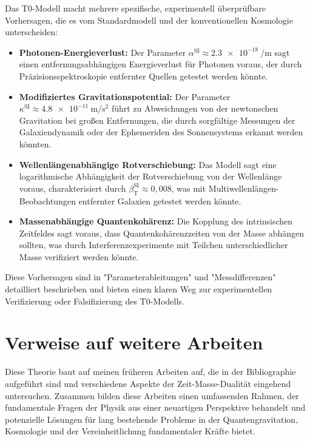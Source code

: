 \documentclass[a4paper,12pt]{article}
\newcommand{\betaT}{\beta_{\text{T}}}
\begin{document}
	Das T0-Modell macht mehrere spezifische, experimentell überprüfbare Vorhersagen, die es vom Standardmodell und der konventionellen Kosmologie unterscheiden:
	
	\begin{itemize}
		\item \textbf{Photonen-Energieverlust:} Der Parameter \(\alpha^{\text{SI}} \approx \SI{2,3e-18}{\per\meter}\) sagt einen entfernungsabhängigen Energieverlust für Photonen voraus, der durch Präzisionsspektroskopie entfernter Quellen getestet werden könnte.
		
		\item \textbf{Modifiziertes Gravitationspotential:} Der Parameter \(\kappa^{\text{SI}} \approx \SI{4,8e-11}{\meter\per\second\squared}\) führt zu Abweichungen von der newtonschen Gravitation bei großen Entfernungen, die durch sorgfältige Messungen der Galaxiendynamik oder der Ephemeriden des Sonnensystems erkannt werden könnten.
		
		\item \textbf{Wellenlängenabhängige Rotverschiebung:} Das Modell sagt eine logarithmische Abhängigkeit der Rotverschiebung von der Wellenlänge voraus, charakterisiert durch \(\betaT^{\text{SI}} \approx 0,008\), was mit Multiwellenlängen-Beobachtungen entfernter Galaxien getestet werden könnte.
		
		\item \textbf{Massenabhängige Quantenkohärenz:} Die Kopplung des intrinsischen Zeitfeldes sagt voraus, dass Quantenkohärenzzeiten von der Masse abhängen sollten, was durch Interferenzexperimente mit Teilchen unterschiedlicher Masse verifiziert werden könnte.
	\end{itemize}
	
	Diese Vorhersagen sind in "Parameterableitungen" \cite{pascher_params_2025} und "Messdifferenzen" \cite{pascher_messdifferenzen_2025} detailliert beschrieben und bieten einen klaren Weg zur experimentellen Verifizierung oder Falsifizierung des T0-Modells.
	
	\section{Verweise auf weitere Arbeiten}
	
	Diese Theorie baut auf meinen früheren Arbeiten auf, die in der Bibliographie aufgeführt sind und verschiedene Aspekte der Zeit-Masse-Dualität eingehend untersuchen. Zusammen bilden diese Arbeiten einen umfassenden Rahmen, der fundamentale Fragen der Physik aus einer neuartigen Perspektive behandelt und potenzielle Lösungen für lang bestehende Probleme in der Quantengravitation, Kosmologie und der Vereinheitlichung fundamentaler Kräfte bietet.
	
\end{document}
